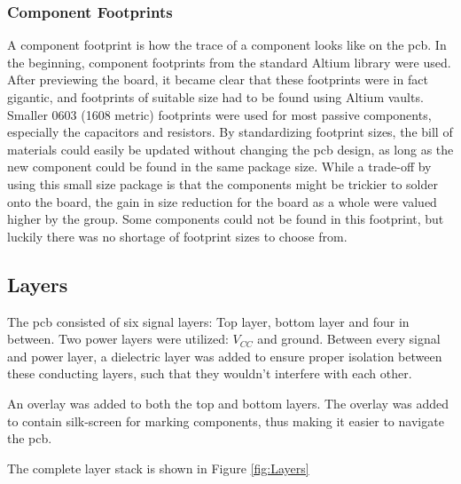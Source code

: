 \subsubsection{Component Footprints}
A component footprint is how the trace of a component looks like on the \gls{pcb}.
In the beginning, component footprints from the standard Altium library were used.
After previewing the board, it became clear that these footprints were in fact gigantic, and footprints of suitable size had to be found using Altium vaults.
Smaller 0603 (1608 metric) footprints were used for most passive components, especially the capacitors and resistors.
By standardizing footprint sizes, the bill of materials could easily be updated without changing the \gls{pcb} design, as long as the new component could be found in the same package size.
While a trade-off by using this small size package is that the components might be trickier to solder onto the board, the gain in size reduction for the board as a whole were valued higher by the group.
Some components could not be found in this footprint, but luckily there was no shortage of footprint sizes to choose from.

\subsection{Layers}
The \gls{pcb} consisted of six signal layers: Top layer, bottom layer and four in between.
Two power layers were utilized: \(V_{CC}\) and ground.
Between every signal and power layer, a dielectric layer was added to ensure proper isolation between these conducting layers, such that they wouldn't interfere with each other.

An overlay was added to both the top and bottom layers.
The overlay was added to contain silk-screen for marking components, thus making it easier to navigate the \gls{pcb}.

The complete layer stack is shown in Figure \ref{fig:Layers}

